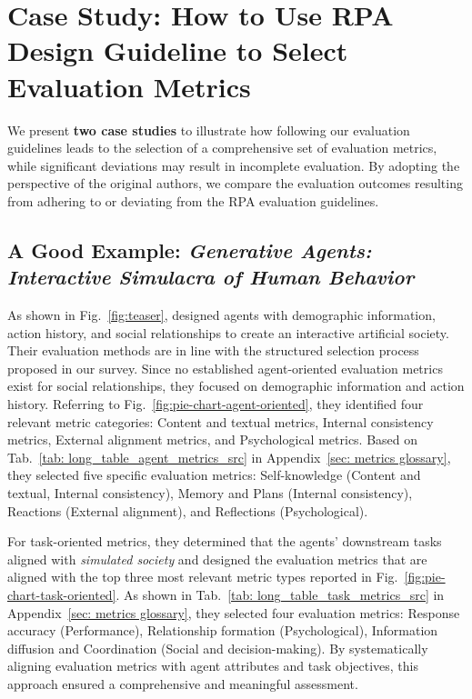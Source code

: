 \section{Case Study: How to Use RPA Design Guideline to Select Evaluation Metrics}

We present \textbf{two case studies} to illustrate how following our evaluation guidelines leads to the selection of a comprehensive set of evaluation metrics, while significant deviations may result in incomplete evaluation. By adopting the perspective of the original authors, we compare the evaluation outcomes resulting from adhering to or deviating from the RPA evaluation guidelines.

\subsection{A Good Example: \textit{Generative Agents: Interactive Simulacra of Human Behavior}}
\label{sec_good_example}

As shown in Fig.~\ref{fig:teaser}, \citet{park2023generative} designed agents with demographic information, action history, and social relationships to create an interactive artificial society. 
Their evaluation methods are in line with the structured selection process proposed in our survey. Since no established agent-oriented evaluation metrics exist for social relationships, they focused on demographic information and action history. Referring to Fig.~\ref{fig:pie-chart-agent-oriented}, they identified four relevant metric categories: Content and textual metrics, Internal consistency metrics, External alignment metrics, and Psychological metrics. Based on Tab.~\ref{tab: long_table_agent_metrics_src} in Appendix~\ref{sec: metrics glossary}, they selected five specific evaluation metrics: Self-knowledge (Content and textual, Internal consistency), Memory and Plans (Internal consistency), Reactions (External alignment), and Reflections (Psychological).

For task-oriented metrics, they determined that the agents’ downstream tasks aligned with \textit{simulated society} and designed the evaluation metrics that are aligned with the top three most relevant metric types reported in Fig.~\ref{fig:pie-chart-task-oriented}.
As shown in Tab.~\ref{tab: long_table_task_metrics_src} in Appendix~\ref{sec: metrics glossary}, they selected four evaluation metrics: Response accuracy (Performance), Relationship formation (Psychological), Information diffusion and Coordination (Social and decision-making). By systematically aligning evaluation metrics with agent attributes and task objectives, this approach ensured a comprehensive and meaningful assessment.

